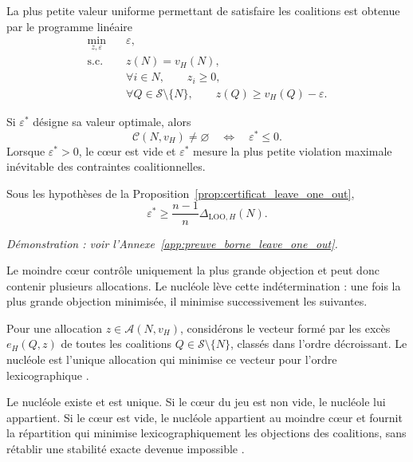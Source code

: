 La plus petite valeur uniforme permettant de satisfaire les coalitions est
obtenue par le programme linéaire
\begin{equation}
\label{eq:lp_moindre_coeur}
\begin{aligned}
\min_{z,\varepsilon}\quad
    & \varepsilon,\\
\text{s.c.}\quad
    & z(N)=v_H(N),\\
    & \forall i\in N,\qquad
      z_i\geqslant0,\\
    & \forall Q\in\mathcal S\setminus\{N\},\qquad
      z(Q)\geqslant v_H(Q)-\varepsilon.
\end{aligned}
\end{equation}

Si $\varepsilon^*$ désigne sa valeur optimale, alors
\[
\mathcal C(N,v_H)\neq\varnothing
\quad\Longleftrightarrow\quad
\varepsilon^*\leqslant0.
\]
Lorsque $\varepsilon^*>0$, le cœur est vide et $\varepsilon^*$ mesure la
plus petite violation maximale inévitable des contraintes coalitionnelles.

\begin{corollaire}
\label{cor:borne_leave_one_out}
Sous les hypothèses de la
Proposition~\ref{prop:certificat_leave_one_out},
\[
    \varepsilon^*
    \geqslant
    \frac{n-1}{n}\Delta_{\mathrm{LOO},H}(N).
\]
\end{corollaire}

\emph{Démonstration : voir l'Annexe~\ref{app:preuve_borne_leave_one_out}.}

Le moindre cœur contrôle uniquement la plus grande objection et peut donc
contenir plusieurs allocations. Le nucléole lève cette indétermination : une
fois la plus grande objection minimisée, il minimise successivement les
suivantes.

\begin{definition}[Nucléole]
\label{def:nucleole}
Pour une allocation $z\in\mathcal A(N,v_H)$, considérons le vecteur formé
par les excès $e_H(Q,z)$ de toutes les coalitions
\(Q\in\mathcal S\setminus\{N\}\), classés dans l'ordre décroissant. Le
nucléole est l'unique allocation qui minimise ce vecteur pour l'ordre
lexicographique \cite{schmeidler1969}.
\end{definition}

\begin{proposition}
\label{prop:proprietes_nucleole}
Le nucléole existe et est unique. Si le cœur du jeu est non vide, le
nucléole lui appartient. Si le cœur est vide, le nucléole appartient au
moindre cœur et fournit la répartition qui minimise lexicographiquement les
objections des coalitions, sans rétablir une stabilité exacte devenue
impossible \cite{schmeidler1969}.
\end{proposition}

